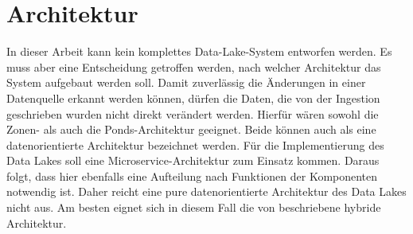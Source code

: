 \section{Architektur}
In dieser Arbeit kann kein komplettes Data-Lake-System entworfen werden.
Es muss aber eine Entscheidung getroffen werden, nach welcher Architektur das System aufgebaut werden soll.
Damit zuverlässig die Änderungen in einer Datenquelle erkannt werden können, dürfen die Daten, die von der Ingestion geschrieben wurden nicht direkt verändert werden.
Hierfür wären sowohl die Zonen- als auch die Ponds-Architektur geeignet.
Beide können auch als eine datenorientierte Architektur bezeichnet werden.
Für die Implementierung des Data Lakes soll eine Microservice-Architektur zum Einsatz kommen.
Daraus folgt, dass hier ebenfalls eine Aufteilung nach Funktionen der Komponenten notwendig ist.
Daher reicht eine pure datenorientierte Architektur des Data Lakes nicht aus.
Am besten eignet sich in diesem Fall die von \textcite{sawadogo2021data} beschriebene hybride Architektur.

